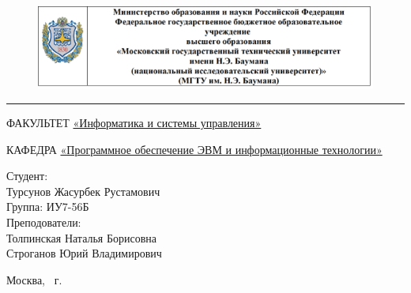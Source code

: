\documentclass[a4paper, 12pt]{article}
\begin{document}
	
\begin{titlepage}
	\fontsize{12pt}{12pt}\selectfont
	\begin{figure}[t!]
		\centering
		\includegraphics[scale=0.8]{bmstu}
	\end{figure}
	
	\noindent\rule{15cm}{3pt}
	\newline\newline
	\noindent 
	ФАКУЛЬТЕТ 
	\underline{«Информатика и системы управления»} \newline\newline
	
	\noindent КАФЕДРА \underline{«Программное обеспечение ЭВМ и информационные технологии»}\newline\newline\newline\newline\newline
	
	\vspace{1mm}
	
	\vspace{8mm}
	
	
	\begin{flushright}
		{\small	Студент:\\ Турсунов Жасурбек Рустамович \\ Группа: ИУ7-56Б
			\vspace{3mm}
			\\Преподователи: \\ Толпинская Наталья Борисовна \\ Строганов Юрий Владимирович}
	\end{flushright}
	
	\begin{center}
		\vfill
		Москва, \the\year
		~г.
	\end{center}
\end{titlepage}
\end{document}
